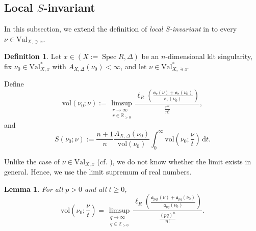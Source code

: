 \documentclass[a4paper,12pt]{amsart}
\newtheorem{lemma}[theorem]{Lemma}
\theoremstyle{definition} %
\newtheorem{definition}[theorem]{Definition}
\theoremstyle{remark}
\numberwithin{equation}{section}
\newcommand{\R}{\mathbb{R}}
\newcommand{\Z}{\mathbb{Z}}
\def\Spec{\operatorname{Spec}}
\begin{document}
\subsection{{Local $S$-invariant}}
In this subsection, we extend the definition of \emph{local $S$-invariant} in \cite[Lemma-Definition 3.1]{XZ20} to every $\nu\in \mathrm{Val}_{X,\ni x}$.

\begin{definition} \label{yongheungdong}
Let $x\in (X:=\Spec R,\Delta)$ be an $n$-dimensional klt singularity, fix $\nu_0\in \mathrm{Val}^*_{X,x}$ with $A_{X,\Delta}(\nu_0)<\infty$, and let $\nu\in \mathrm{Val}^*_{X,\ni x}$.

\smallskip

Define
$$ \mathrm{vol}(\nu_0;\nu):=\limsup_{\substack{r\to \infty \\ r\in \R_{>0}}}\frac{\ell_R\left(\frac{\mathfrak{a}_{r}(\nu)+\mathfrak{a}_r(\nu_0)}{\mathfrak{a}_r(\nu_0)}\right)}{\frac{r^n}{n!}},$$
and
$$ S(\nu_0;\nu):=\frac{n+1}{n}\frac{A_{X,\Delta}(\nu_0)}{\mathrm{vol}(\nu_0)}\int^{\infty}_0\mathrm{vol}\left(\nu_0;\frac{\nu}{t}\right)\,\mathrm{d}t.$$
\end{definition}

Unlike the case of $\nu\in \mathrm{Val}_{X,x}$ (cf. \cite[Lemma-Definition 3.1]{XZ20}), we do not know whether the limit exists in general. Hence, we use the limit supremum of real numbers.

\begin{lemma} \label{3.2}
For all $p>0$ and all $t\ge 0$,
$$ \mathrm{vol}\left(\nu_0;\frac{\nu}{t}\right)=\limsup_{\substack{q\to \infty \\ q\in \Z_{>0}}}\frac{\ell_R\left(\frac{\mathfrak{a}_{pqt}(\nu)+\mathfrak{a}_{pq}(\nu_0)}{\mathfrak{a}_{pq}(\nu_0)}\right)}{\frac{(pq)^n}{n!}}.$$
\end{lemma}
\end{document}
